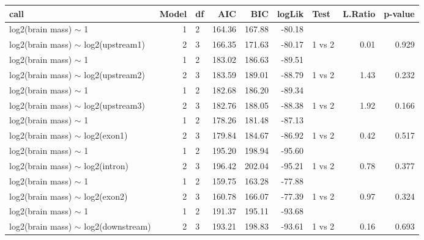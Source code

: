\begin{table}[ht]
\centering
\begin{tabular}{lrlrrrlrr}
  \hline
call & Model & df & AIC & BIC & logLik & Test & L.Ratio & p-value \\ 
  \hline
log2(brain mass) $\sim$ 1 &  1 & 2 & 164.36 & 167.88 & -80.18 &  &  &  \\ 
  log2(brain mass) $\sim$ log2(upstream1) &  2 & 3 & 166.35 & 171.63 & -80.17 & 1 vs 2 & 0.01 & 0.929 \\ 
   \hline
log2(brain mass) $\sim$ 1 &  1 & 2 & 183.02 & 186.63 & -89.51 &  &  &  \\ 
  log2(brain mass) $\sim$ log2(upstream2) &  2 & 3 & 183.59 & 189.01 & -88.79 & 1 vs 2 & 1.43 & 0.232 \\ 
   \hline
log2(brain mass) $\sim$ 1 &  1 & 2 & 182.68 & 186.20 & -89.34 &  &  &  \\ 
  log2(brain mass) $\sim$ log2(upstream3) &  2 & 3 & 182.76 & 188.05 & -88.38 & 1 vs 2 & 1.92 & 0.166 \\ 
   \hline
log2(brain mass) $\sim$ 1 &  1 & 2 & 178.26 & 181.48 & -87.13 &  &  &  \\ 
  log2(brain mass) $\sim$ log2(exon1) &  2 & 3 & 179.84 & 184.67 & -86.92 & 1 vs 2 & 0.42 & 0.517 \\ 
   \hline
log2(brain mass) $\sim$ 1 &  1 & 2 & 195.20 & 198.94 & -95.60 &  &  &  \\ 
  log2(brain mass) $\sim$ log2(intron) &  2 & 3 & 196.42 & 202.04 & -95.21 & 1 vs 2 & 0.78 & 0.377 \\ 
   \hline
log2(brain mass) $\sim$ 1 &  1 & 2 & 159.75 & 163.28 & -77.88 &  &  &  \\ 
  log2(brain mass) $\sim$ log2(exon2) &  2 & 3 & 160.78 & 166.07 & -77.39 & 1 vs 2 & 0.97 & 0.324 \\ 
   \hline
log2(brain mass) $\sim$ 1 &  1 & 2 & 191.37 & 195.11 & -93.68 &  &  &  \\ 
  log2(brain mass) $\sim$ log2(downstream) &  2 & 3 & 193.21 & 198.83 & -93.61 & 1 vs 2 & 0.16 & 0.693 \\ 
   \hline
\end{tabular}
\end{table}
